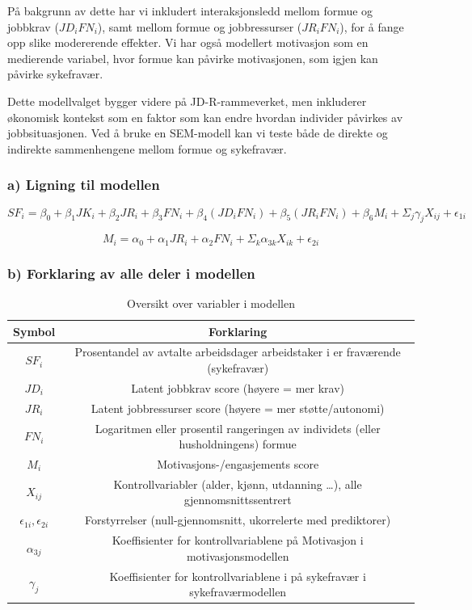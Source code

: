\documentclass[
  12pt,
  a4paper,
  DIV=11,
  numbers=noendperiod]{scrartcl}
\begin{document}
På bakgrunn av dette har vi inkludert interaksjonsledd mellom formue og
jobbkrav (\(JD_i FN_i\)), samt mellom formue og jobbressurser
(\(JR_i FN_i\)), for å fange opp slike modererende effekter. Vi har også
modellert motivasjon som en medierende variabel, hvor formue kan påvirke
motivasjonen, som igjen kan påvirke sykefravær.

Dette modellvalget bygger videre på JD-R-rammeverket, men inkluderer
økonomisk kontekst som en faktor som kan endre hvordan individer
påvirkes av jobbsituasjonen. Ved å bruke en SEM-modell kan vi teste både
de direkte og indirekte sammenhengene mellom formue og sykefravær.

\subsubsection{a) Ligning til modellen}\label{a-ligning-til-modellen}

\[
SF_i = \beta_0 + \beta_1 JK_i + \beta_2 JR_i + \beta_3 FN_i + \beta_4 (JD_iFN_i) + \beta_5 (JR_i FN_i) + \beta_6 M_i + \Sigma_j \gamma_{j}X_{ij} + \epsilon_{1i}
\]

\[
M_i = \alpha_0 + \alpha_1 JR_i + \alpha_2 FN_i + \Sigma_k \alpha_{3k}X_{ik} + \epsilon_{2i}
\]

\subsubsection{b) Forklaring av alle deler i
modellen}\label{b-forklaring-av-alle-deler-i-modellen}

\begin{table}[H]
\centering
\begin{tabular}{|c|c|}
\hline
Symbol & Forklaring \\ 
\hline
$SF_i$ & Prosentandel av avtalte arbeidsdager arbeidstaker i er fraværende (sykefravær) \\
\hline
$JD_i$ & Latent jobbkrav score (høyere = mer krav) \\
\hline
$JR_i$ & Latent jobbressurser score (høyere = mer støtte/autonomi) \\
\hline
$FN_i$ & Logaritmen eller prosentil rangeringen av individets (eller husholdningens) formue \\
\hline
$M_i$ & Motivasjons-/engasjements score \\
\hline
$X_{ij}$ & Kontrollvariabler (alder, kjønn, utdanning …), alle gjennomsnittssentrert \\
\hline
$\epsilon_{1i}, \epsilon_{2i}$ & Forstyrrelser (null-gjennomsnitt, ukorrelerte med prediktorer) \\  
\hline
$\alpha_{3j} $ & Koeffisienter for kontrollvariablene på Motivasjon i motivasjonsmodellen \\
\hline
$\gamma_{j} $ & Koeffisienter for kontrollvariablene i på sykefravær i sykefraværmodellen \\
\hline
\end{tabular}
\caption{Oversikt over variabler i modellen}
\label{tab:variabler}
\end{table}
\end{document}
